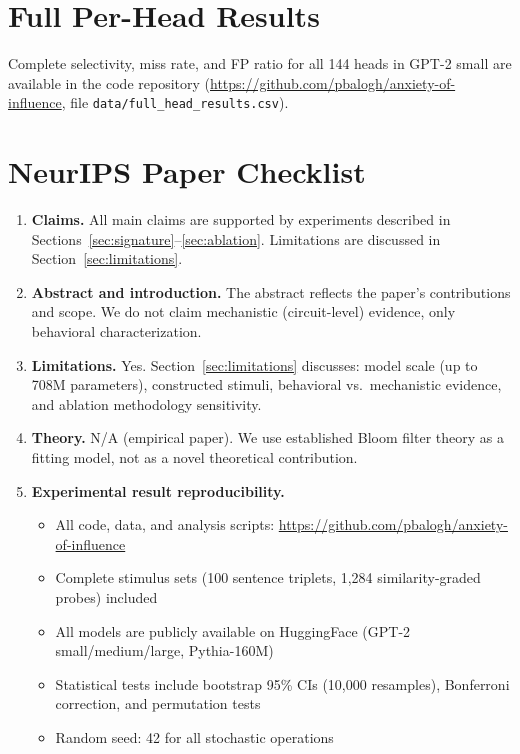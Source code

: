 \documentclass[11pt]{article}
\begin{document}
\section{Full Per-Head Results}
\label{app:fullresults}

Complete selectivity, miss rate, and FP ratio for all 144 heads in GPT-2 small are available in the code repository (\url{https://github.com/pbalogh/anxiety-of-influence}, file \texttt{data/full\_head\_results.csv}).

\section{NeurIPS Paper Checklist}
\label{app:checklist}

\begin{enumerate}

\item \textbf{Claims.} All main claims are supported by experiments described in Sections~\ref{sec:signature}--\ref{sec:ablation}. Limitations are discussed in Section~\ref{sec:limitations}.

\item \textbf{Abstract and introduction.} The abstract reflects the paper's contributions and scope. We do not claim mechanistic (circuit-level) evidence, only behavioral characterization.

\item \textbf{Limitations.} Yes. Section~\ref{sec:limitations} discusses: model scale (up to 708M parameters), constructed stimuli, behavioral vs.\ mechanistic evidence, and ablation methodology sensitivity.

\item \textbf{Theory.} N/A (empirical paper). We use established Bloom filter theory \citep{bloom1970space} as a fitting model, not as a novel theoretical contribution.

\item \textbf{Experimental result reproducibility.}
\begin{itemize}
    \item All code, data, and analysis scripts: \url{https://github.com/pbalogh/anxiety-of-influence}
    \item Complete stimulus sets (100 sentence triplets, 1,284 similarity-graded probes) included
    \item All models are publicly available on HuggingFace (GPT-2 small/medium/large, Pythia-160M)
    \item Statistical tests include bootstrap 95\% CIs (10,000 resamples), Bonferroni correction, and permutation tests
    \item Random seed: 42 for all stochastic operations
\end{itemize}


\end{enumerate}
\end{document}
